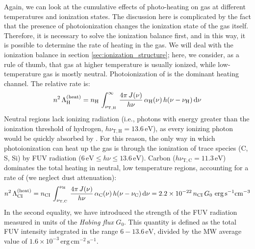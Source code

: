 Again, we can look at the cumulative effects of photo-heating on gas at different temperatures and ionization states. The discussion here is complicated by the fact that the presence of photoionization changes the ionization state of the gas itself. Therefore, it is necessary to solve the ionization balance first, and in this way, it is possible to determine the rate of heating in the gas. We will deal with the ionization balance in section \ref{sec:ionization_structure}; here, we consider, as a rule of thumb, that gas at higher temperature is usually ionized, while low-temperature gas is mostly neutral. Photoionization of \HI is the dominant heating channel. The relative rate is:
\begin{align}
    n^2 \,\Lambda_\mathrm{H}^\mathrm{(heat)} = n_\mathrm{H}\,\int_{\nu_\mathrm{T,H}}^\infty \,\frac{4\pi\,J(\nu)}{h\nu} \,\alpha_\mathrm{H}(\nu)\,h(\nu-\nu_\mathrm{H})\,\mathrm{d} \nu
\end{align}
Neutral regions lack ionizing radiation (i.e., photons with energy greater than the ionization threshold of hydrogen, $h\nu_\mathrm{T,H}=13.6\,\mathrm{eV}$), as every ionizing photon would be quickly absorbed by \HI. For this reason, the only way in which photoionization can heat up the gas is through the ionization of trace species (C, S, Si) by FUV radiation ($6\,\mathrm{eV}\leq h\nu\leq  13.6\,\mathrm{eV}$). Carbon ($h\nu_\mathrm{T,C}=11.3\,\mathrm{eV}$) dominates the total heating in neutral, low temperature regions, accounting for a rate of (we neglect dust attenuation):
\begin{align}
    n^2 \,\Lambda_\mathrm{CI}^\mathrm{(heat)} = n_\mathrm{CI}\,\int_{\nu_\mathrm{T,C}}^{\nu_\mathrm{H}} \,\frac{4\pi\,J(\nu)}{h\nu} \,\alpha_\mathrm{C}(\nu)\,h(\nu-\nu_\mathrm{C})\,\mathrm{d} \nu = 2.2\times10^{-22}\,n_\mathrm{CI}\,G_0\,\,\mathrm{erg}\,\mathrm{s}^{-1}\mathrm{cm}^{-3}
\end{align}
In the second equality, we have introduced the strength of the FUV radiation measured in units of the \textit{Habing flux} $G_0$. This quantity is defined as the total FUV intensity integrated in the range $6 - 13.6 \,\mathrm{eV}$, divided by the MW average value of $1.6\times 10^{-3}\,\mathrm{erg} \,\mathrm{cm}^{-2}\,\mathrm{s}^{-1}$.

